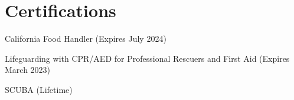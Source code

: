 \section{Certifications}

California Food Handler (Expires July 2024)

Lifeguarding with CPR/AED for Professional Rescuers and First Aid (Expires March 2023)

SCUBA (Lifetime)

